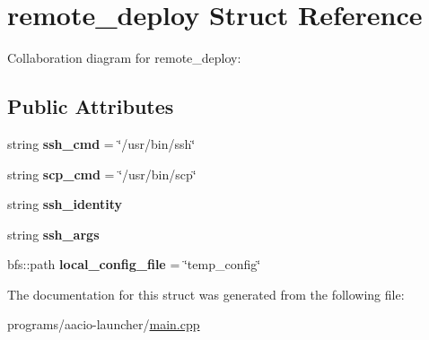 \hypertarget{structremote__deploy}{}\section{remote\+\_\+deploy Struct Reference}
\label{structremote__deploy}


Collaboration diagram for remote\+\_\+deploy\+:
\subsection*{Public Attributes}
\begin{DoxyCompactItemize}
\item 
\mbox{\label{structremote__deploy_a515c6b085d173f53cb20a4cfea24a598}} 
string {\bfseries ssh\+\_\+cmd} = \char`\"{}/usr/bin/ssh\char`\"{}
\item 
\mbox{\label{structremote__deploy_a87bf52cc075e54024a7f4018d03dd0e8}} 
string {\bfseries scp\+\_\+cmd} = \char`\"{}/usr/bin/scp\char`\"{}
\item 
\mbox{\label{structremote__deploy_ab69980cffe2a4924ce12b7278dd665d3}} 
string {\bfseries ssh\+\_\+identity}
\item 
\mbox{\label{structremote__deploy_af4d795e09a6e8a24e7987aa6ad81d8fb}} 
string {\bfseries ssh\+\_\+args}
\item 
\mbox{\label{structremote__deploy_ad61b4cd2bd56093b4e0924c6f740eb45}} 
bfs\+::path {\bfseries local\+\_\+config\+\_\+file} = \char`\"{}temp\+\_\+config\char`\"{}
\end{DoxyCompactItemize}


The documentation for this struct was generated from the following file\+:\begin{DoxyCompactItemize}
\item 
programs/aacio-\/launcher/\mbox{\hyperlink{programs_2aacio-launcher_2main_8cpp}{main.\+cpp}}\end{DoxyCompactItemize}
